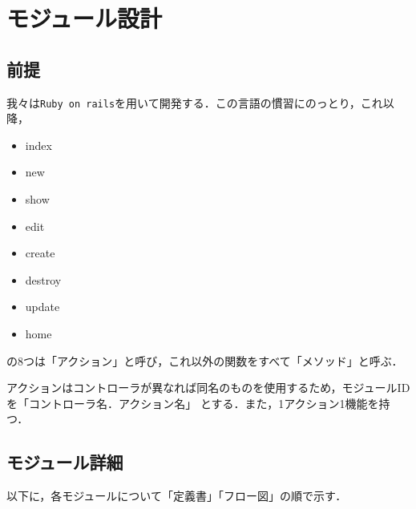 \chapter{モジュール設計}
\section{前提}
我々は\texttt{Ruby on rails}を用いて開発する．この言語の慣習にのっとり，これ以降，
\begin{itemize}
	\item index
	\item new
	\item show
	\item edit
	\item create
	\item destroy
	\item update
	\item home
\end{itemize}
の8つは「アクション」と呼び，これ以外の関数をすべて「メソッド」と呼ぶ．\par
アクションはコントローラが異なれば同名のものを使用するため，モジュールIDを「コントローラ名．アクション名」
とする．また，1アクション1機能を持つ．

\section{モジュール詳細}
以下に，各モジュールについて「定義書」「フロー図」の順で示す．

\clearpage

